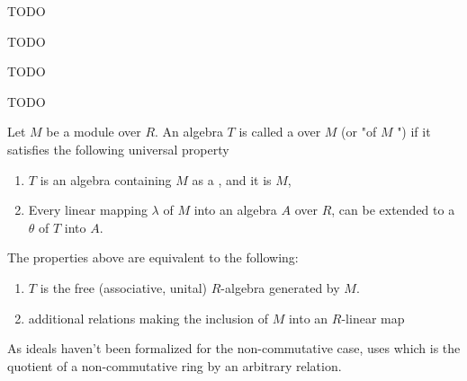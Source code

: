 \begin{definition}[FreeAlgebra]
    \label{FreeAlgebra}

    TODO

\end{definition}

\begin{definition}[LinearMap]
    \label{LinearMap}

    TODO

\end{definition}

\begin{definition}[RingQuot]
    \label{RingQuot}

    TODO

\end{definition}

\begin{definition}
    \label{TensorAlgebra_Rel}

    TODO

\end{definition}

\begin{definition}
    \label{TensorAlgebra}

    Let $M$ be a module over $R$. An algebra $T$ is called a  over $M$ (or "of $M$ ")
    if it satisfies the following universal property

    \begin{enumerate}
    \item $T$ is an algebra containing $M$ as a , and it is  $M$,
    \item Every linear mapping $\lambda$ of $M$ into an algebra $A$ over $R$, can be extended to 
    a  $\theta$ of $T$ into $A$.
    \end{enumerate}

\end{definition}

\begin{remark}
    \label{mk:TensorAlgebra}

    The properties above are equivalent to the following:

    \begin{enumerate}
        \item $T$ is the free (associative, unital) $R$-algebra generated by $M$.
        \item additional relations making the inclusion of $M$ into an $R$-linear map
    \end{enumerate}

    As ideals haven't been formalized for the non-commutative case, \Mathlib uses  which is
    the quotient of a non-commutative ring by an arbitrary relation.
    
\end{remark}